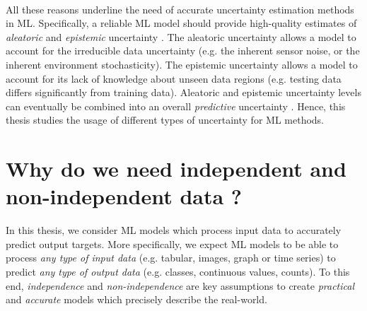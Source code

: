 \paragraph*{} All these reasons underline the need of accurate uncertainty estimation methods in ML. 
Specifically, a reliable ML model should provide high-quality estimates of \emph{aleatoric} and \emph{epistemic} uncertainty \citep{uncertainty-deep-learning}.
The aleatoric uncertainty allows a model to account for the irreducible data uncertainty (e.g. the inherent sensor noise, or the inherent environment stochasticity).
The epistemic uncertainty allows a model to account for its lack of knowledge about unseen data regions (e.g. testing data differs significantly from training data).
Aleatoric and epistemic uncertainty levels can eventually be combined into an overall \emph{predictive} uncertainty \citep{uncertainty-deep-learning}. Hence, this thesis studies the usage of different types of uncertainty for ML methods.

\section{Why do we need independent and non-independent data ?}

In this thesis, we consider ML models which process input data to accurately predict output targets. 
More specifically, we expect ML models to be able to process \emph{any type of input data} (e.g. tabular, images, graph or time series) to predict \emph{any type of output data} (e.g. classes, continuous values, counts).
To this end, \emph{independence} and \emph{non-independence} are key assumptions to create \emph{practical} and \emph{accurate} models which precisely describe the real-world. 

